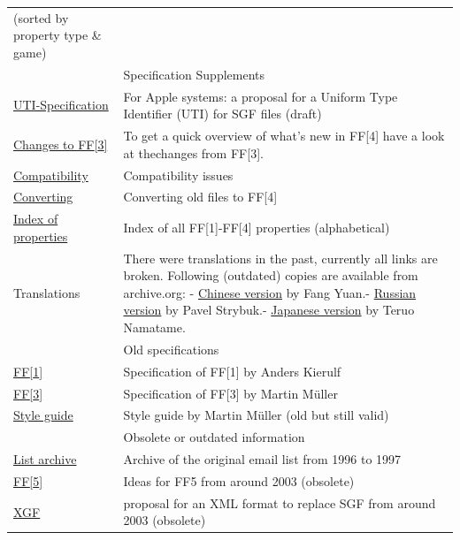 {\begin{longtable}[]{@{}
  >{\raggedright\arraybackslash}p{}
  >{\raggedright\arraybackslash}p{}@{}}
{properties} (sorted by property type \& game) \\
& Specification Supplements \\
\href{https://red-bean.com/sgf/drafts/sgf-uti-draft-2013-05-05.html}{UTI-Specification}
& For Apple systems: a proposal for a Uniform Type Identifier (UTI) for
SGF files (draft) \\
\href{https://red-bean.com/sgf/changes.html}{Changes to FF{[}3{]}} & To
get a quick overview of what's new in FF{[}4{]} have a look at
thechanges from FF{[}3{]}. \\
\href{https://red-bean.com/sgf/compatibility.html}{Compatibility} &
Compatibility issues \\
\href{https://red-bean.com/sgf/converting.html}{Converting} & Converting
old files to FF{[}4{]} \\
\href{https://red-bean.com/sgf/proplist_ff.html}{Index of properties} &
Index of all FF{[}1{]}-FF{[}4{]} properties (alphabetical) \\
Translations & There were translations in the past, currently all links
are broken. Following (outdated) copies are available from archive.org:
-
\href{https://web.archive.org/web/20191224010704/http://zuolin.tech/sgf/}{Chinese
version} by Fang Yuan.-
\href{https://web.archive.org/web/20130115020851/http://rusgolib.iponweb.net/SGF/}{Russian
version} by Pavel Strybuk.-
\href{https://web.archive.org/web/20021231014231fw_/http://vof.jp/SGFnote/SGFUserGuide.html}{Japanese
version} by Teruo Namatame. \\
& Old specifications \\
\href{https://red-bean.com/sgf/ff1_3/ff1.html}{FF{[}1{]}} &
Specification of FF{[}1{]} by Anders Kierulf \\
\href{https://red-bean.com/sgf/ff1_3/ff3.html}{FF{[}3{]}} &
Specification of FF{[}3{]} by Martin Müller \\
\href{https://red-bean.com/sgf/ff1_3/style.html}{Style guide} & Style
guide by Martin Müller (old but still valid) \\
& Obsolete or outdated information \\
\href{https://red-bean.com/sgf/discussion/}{List archive} & Archive of
the original email list from 1996 to 1997 \\
\href{https://red-bean.com/sgf/ff5/ff5.htm}{FF{[}5{]}} & Ideas for FF5
from around 2003 (obsolete) \\
\href{https://red-bean.com/sgf/xml/}{XGF} & proposal for an XML format
to replace SGF from around 2003 (obsolete) \\
\end{longtable}
}

